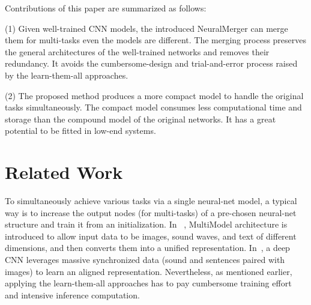 \documentclass{article}
\begin{document}
	Contributions of this paper are summarized as follows:
	
	\noindent (1) Given well-trained CNN models, the introduced NeuralMerger can merge them for multi-tasks even the models are different. The merging process preserves the general architectures of the well-trained networks and removes their redundancy. It avoids the cumbersome-design and trial-and-error process raised by the learn-them-all approaches.
	
	\noindent (2) The proposed method produces a more compact model to handle the original tasks simultaneously. The compact model consumes less computational time and storage than the compound model of the original networks. It has a great potential to be fitted in low-end systems.
	
	
	
	\section{Related Work}
	To simultaneously achieve various tasks via a single neural-net model, a typical way is to increase the output nodes (for multi-tasks) of a pre-chosen neural-net structure and train it from an initialization.
	In ~\cite{DBLP:journals/corr/KaiserGSVPJU17}, MultiModel architecture is introduced to allow input data to be images, sound waves, and text of different dimensions, and then converts them into a unified representation.
	In~\cite{DBLP:journals/corr/AytarVT17}, a deep CNN leverages massive synchronized data (sound and sentences paired with images) to learn an aligned representation.
	Nevertheless, as mentioned earlier, applying the learn-them-all approaches has to pay cumbersome training effort and intensive inference computation.
	
\end{document}
